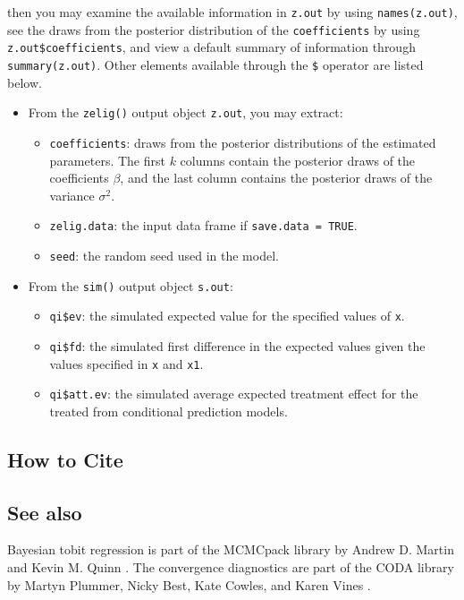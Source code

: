 \noindent then you may examine the available information in \texttt{z.out} by
using \texttt{names(z.out)}, see the draws from the posterior distribution of
the \texttt{coefficients} by using \texttt{z.out\$coefficients}, and view a 
default summary of information through \texttt{summary(z.out)}. Other elements
available through the \texttt{\$} operator are listed below.

\begin{itemize}
\item From the \texttt{zelig()} output object \texttt{z.out}, you may extract:

\begin{itemize}
\item \texttt{coefficients}: draws from the posterior distributions
of the estimated parameters. The first $k$ columns contain the posterior draws
of the coefficients $\beta$, and the last column contains the posterior draws 
of the variance $\sigma^2$.

   \item {\tt zelig.data}: the input data frame if {\tt save.data = TRUE}.  
\item \texttt{seed}: the random seed used in the model.

\end{itemize}

\item From the \texttt{sim()} output object \texttt{s.out}:

\begin{itemize}
\item \texttt{qi\$ev}: the simulated expected value for the specified
values of \texttt{x}.

\item \texttt{qi\$fd}: the simulated first difference in the expected
values given the values specified in \texttt{x} and \texttt{x1}.

\item \texttt{qi\$att.ev}: the simulated average expected treatment effect
for the treated from conditional prediction models.

\end{itemize}
\end{itemize}

\subsection* {How to Cite} 



\subsection*{See also}
Bayesian tobit regression is part of the MCMCpack library by Andrew D. Martin and Kevin M. Quinn \citep{MarQui05}. The convergence diagnostics are part of the CODA library by Martyn Plummer, Nicky Best, Kate Cowles, and Karen Vines \citep{PluBesCowVin05}.
